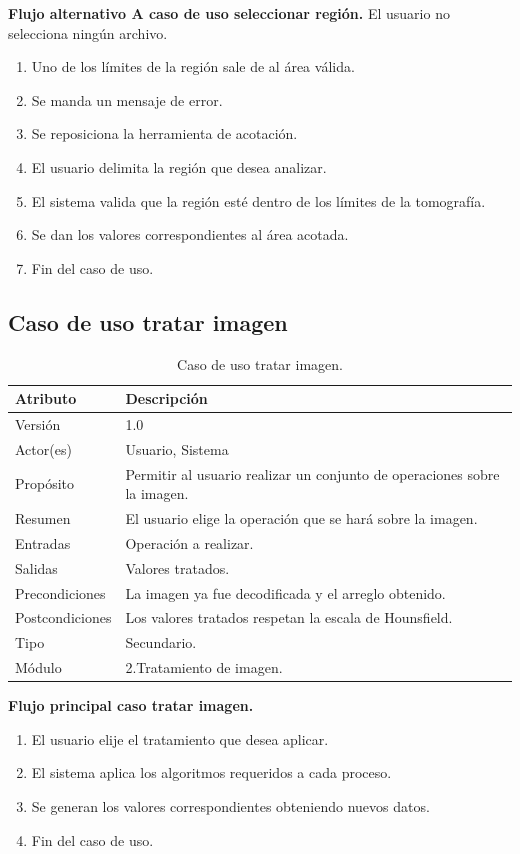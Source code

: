 \documentclass[12pt]{report}
\begin{document}
\textbf{Flujo alternativo A caso de uso seleccionar región. }
El usuario no selecciona ningún archivo.
\begin{enumerate}[{A}1{.}]
\item Uno de los límites de la región sale de al área válida.
\item Se manda un mensaje de error.
\item Se reposiciona la herramienta de acotación.
\item El usuario delimita la región que desea analizar.
\item El sistema valida que la región esté dentro de los límites de la tomografía.
\item Se dan los valores correspondientes al área acotada.
\item Fin del caso de uso.
\end{enumerate}

\subsection{Caso de uso tratar imagen}
\begin{table}[H]
\begin{center}
\begin{tabular}{|p{25mm}|p{60mm}|}
\hline
Atributo & Descripción\\
\hline \hline 
Versión & 1.0\\
\hline
Actor(es) & Usuario, Sistema\\
\hline
Propósito & Permitir al usuario realizar un conjunto de operaciones sobre la imagen.\\
\hline
Resumen & El usuario elige la operación que se hará sobre la imagen.\\
\hline
Entradas & Operación a realizar.\\
\hline
Salidas & Valores tratados.\\
\hline
Precondiciones & La imagen ya fue decodificada y el arreglo obtenido.\\
\hline
Postcondiciones & Los valores tratados respetan la escala de Hounsfield.\\
\hline
Tipo & Secundario.\\
\hline 
Módulo & 2.Tratamiento de imagen.\\
\hline
\end{tabular}
\caption{Caso de uso tratar imagen.}
\end{center}
\end{table}

\textbf{Flujo principal caso tratar imagen. }
\begin{enumerate}
\item El usuario elije el tratamiento que desea aplicar.
\item El sistema aplica los algoritmos requeridos a cada proceso.
\item Se generan los valores correspondientes obteniendo nuevos datos.
\item Fin del caso de uso.
\end{enumerate}
\end{document}
